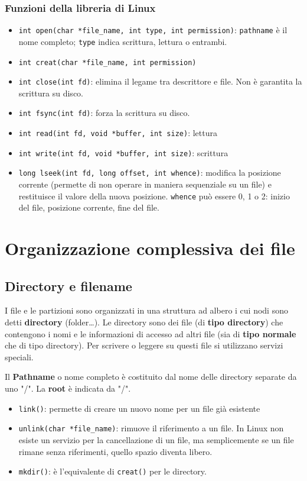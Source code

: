 \documentclass[12pt, a4paper]{report}
\begin{document}
\subsubsection{Funzioni della libreria di Linux}
\begin{itemize}
	\item \texttt{int open(char *file\_name, int type, int permission)}:
		\texttt{pathname} è il nome completo; \texttt{type} indica scrittura,
		lettura o entrambi.
	\item \texttt{int creat(char *file\_name, int permission)}
	\item \texttt{int close(int fd)}: elimina il legame tra descrittore e file.
		Non è garantita la scrittura su disco.
	\item \texttt{int fsync(int fd)}: forza la scrittura su disco.
	\item \texttt{int read(int fd, void *buffer, int size)}: lettura
	\item \texttt{int write(int fd, void *buffer, int size)}: scrittura
	\item \texttt{long lseek(int fd, long offset, int whence)}: modifica la
		posizione corrente (permette di non operare in maniera sequenziale su un
		file) e restituisce il valore della nuova posizione. \texttt{whence} può
		essere 0, 1 o 2: inizio del file, posizione corrente, fine del file.
\end{itemize}

\section{Organizzazione complessiva dei file}

\subsection{Directory e filename}
I file e le partizioni sono organizzati in una struttura ad albero i cui nodi
sono detti \textbf{directory} (folder\dots). Le directory sono dei file (di
\textbf{tipo directory}) che contengono i nomi e le informazioni di accesso ad
altri file (sia di \textbf{tipo normale} che di tipo directory). Per scrivere o
leggere su questi file si utilizzano servizi speciali.

Il \textbf{Pathname} o nome completo è costituito dal nome delle directory
separate da uno "/". La \textbf{root} è indicata da "/".

\begin{itemize}
	\item \texttt{link()}: permette di creare un nuovo nome per un file già
		esistente
	\item \texttt{unlink(char *file\_name)}: rimuove il riferimento a un file.
		In Linux non esiste un servizio per la cancellazione di un file, ma
		semplicemente se un file rimane senza riferimenti, quello spazio diventa
		libero.
	\item \texttt{mkdir()}: è l'equivalente di \texttt{creat()} per le
		directory.
\end{itemize}
\end{document}
